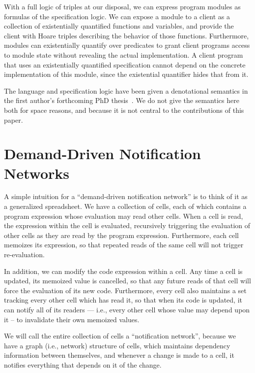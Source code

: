\documentclass[natbib]{sigplanconf}
\begin{document}
With a full logic of triples at our disposal, we can express program
modules as formulas of the specification logic. We can expose a module
to a client as a collection of existentially quantified functions and
variables, and provide the client with Hoare triples describing the
behavior of those functions. Furthermore, modules can existentially
quantify over predicates to grant client programs access to module
state without revealing the actual implementation. A client program
that uses an existentially quantified specification cannot depend on
the concrete implementation of this module, since the existential
quantifier hides that from it.

The language and specification logic have been given a denotational
semantics in the first author's forthcoming PhD
thesis~\cite{tech-report}. We do not give the semantics here both for
space reasons, and because it is not central to the contributions of
this paper. 

\section{Demand-Driven Notification Networks}

A simple intuition for a ``demand-driven notification network'' is to
think of it as a generalized spreadsheet. We have a collection of
cells, each of which contains a program expression whose evaluation may
read other cells. When a cell is read, the expression within the
cell is evaluated, recursively triggering the evaluation of other
cells as they are read by the program expression. Furthermore, each
cell memoizes its expression, so that repeated reads of the same cell
will not trigger re-evaluation.

In addition, we can modify the code expression within a cell.  Any
time a cell is updated, its memoized value is cancelled, so that any
future reads of that cell will force the evaluation of its new
code. Furthermore, every cell also maintains a set tracking every
other cell which has read it, so that when its code is updated, it can
notify all of its readers --- i.e., every other cell whose value may
depend upon it -- to invalidate their own memoized values. 

We will call the entire collection of cells a ``notification
network'', because we have a graph (i.e., network) structure of cells,
which maintains dependency information between themselves, and
whenever a change is made to a cell, it notifies everything that
depends on it of the change.
\end{document}
